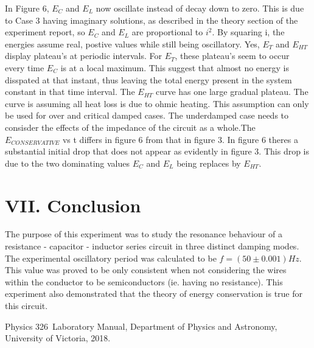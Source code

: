 \documentclass[twocolumn, letterpaper, 10pt, twoside]{article}
\newcommand{\coursenum}{326}
\begin{document}
In Figure 6, $E_C$ and $E_L$ now oscillate instead of decay down to zero. This is due to Case 3 having imaginary solutions, as described in the theory section of the experiment report, so $E_C$ and $E_L$ are proportional to $i^2$. By squaring i, the energies assume real, postive values while still being oscillatory. Yes, $E_T$ and $E_{HT}$ display plateau's at periodic intervals. For $E_T$, these plateau's seem to occur every time $E_C$ is at a local maximum. This suggest that almost no energy is disspated at that instant, thus leaving the total energy present in the system constant in that time interval. The $E_{HT}$ curve has one large gradual plateau. The curve is assuming all heat loss is due to ohmic heating. This assumption can only be used for over and critical damped cases. The underdamped case needs to consisder the effects of the impedance of the circuit as a whole.The $E_{CONSERVATIVE}$  vs t differs in figure 6 from that in figure 3. In figure 6 theres a substantial initial drop that does not appear as evidently in figure 3. This drop is due to the two dominating values $E_C$ and $E_L$ being replaces by $E_{HT}$. 

  
    \section*{VII. Conclusion}
   
   The purpose of this experiment was to study the resonance behaviour of a resistance - capacitor - inductor series circuit in three distinct damping modes. The experimental oscillatory period was calculated to be $f = (50 \pm 0.001) Hz$. This value was proved to be only consistent when not considering the wires within the conductor to be semiconductors (ie. having no resistance). This experiment also demonstrated that the theory of energy conservation is true for this circuit. 
   
    
    \begin{thebibliography}{1}
            Physics \coursenum~Laboratory Manual,
            Department of Physics and Astronomy, University of Victoria, 2018.
    \end{thebibliography}

    \newpage
     \onecolumn
    \centering
\end{document}
